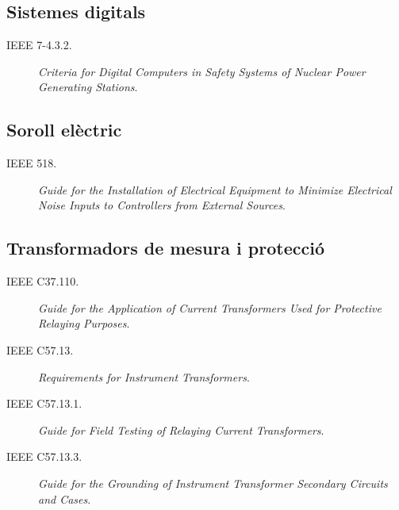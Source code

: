 \subsection*{Sistemes digitals}
\begin{description}
	\item [\hspace{5mm}IEEE 7-4.3.2.] \textit{Criteria for Digital Computers in Safety Systems of Nuclear Power Generating Stations}.
\end{description}


\subsection*{Soroll elèctric}
\begin{description}
	\item [\hspace{5mm}IEEE 518.] \textit{Guide for the Installation of Electrical Equipment to Minimize Electrical Noise Inputs to Controllers from External Sources}.
\end{description}


\subsection*{Transformadors de mesura i protecció}
\begin{description}
	\item [\hspace{5mm}IEEE C37.110.] \textit{Guide for the Application of Current Transformers Used for Protective Relaying Purposes}.
	\item [\hspace{5mm}IEEE C57.13.] \textit{Requirements for Instrument Transformers}.
	\item [\hspace{5mm}IEEE C57.13.1.] \textit{Guide for Field Testing of Relaying Current Transformers}.
	\item [\hspace{5mm}IEEE C57.13.3.]  \textit{Guide for the Grounding of Instrument Transformer Secondary Circuits and Cases}.
\end{description}


